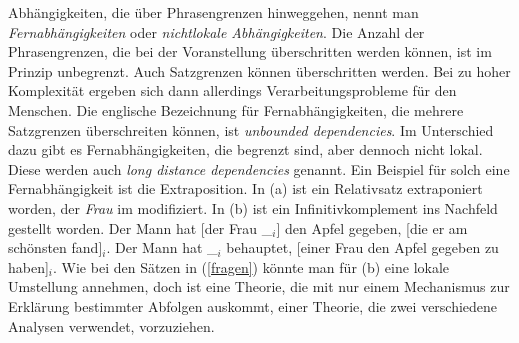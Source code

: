 Abhängigkeiten, die über Phrasengrenzen hinweggehen, nennt man
\emph{Fernabhängigkeiten} oder \emph{nichtlokale Abhängigkeiten}. Die Anzahl der Phrasengrenzen, die bei der Voranstellung überschritten werden können, ist im Prinzip
unbegrenzt. Auch Satzgrenzen können überschritten werden. Bei zu hoher Komplexität ergeben sich
dann allerdings Verarbeitungsprobleme für den Menschen. 
Die englische Bezeichnung für Fernabhängigkeiten, die mehrere Satzgrenzen überschreiten können,
ist \emph{unbounded dependencies}. Im Unterschied dazu gibt es Fernabhängigkeiten, die
begrenzt sind, aber dennoch nicht lokal. Diese werden auch \emph{long distance dependencies}
genannt. Ein Beispiel für solch eine Fernabhängigkeit ist die Extraposition.
In (a) ist ein Relativsatz extraponiert worden, der \emph{Frau} im \mf modifiziert.
In (b) ist ein Infinitivkomplement ins Nachfeld gestellt worden. 
\eal
\label{bsp-extrap}
\ex Der Mann hat [der Frau \_$_i$] den Apfel gegeben, [die er am schönsten fand]$_i$.
\ex Der Mann hat \_$_i$ behauptet, [einer Frau den Apfel gegeben zu haben]$_i$.
\zl
Wie bei den Sätzen
in (\ref{fragen}) könnte man für (b) eine lokale Umstellung annehmen, doch ist eine
Theorie, die mit nur einem Mechanismus zur Erklärung bestimmter Abfolgen auskommt, einer
Theorie, die zwei verschiedene Analysen verwendet, vorzuziehen.

